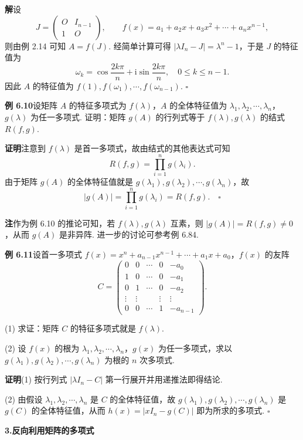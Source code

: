 \documentclass[UTF8, 12pt, fontset=fandol, oneside]{ctexart}
\begin{document}
\noindent\textbf{解}\quad 设
\[
J=\left(\begin{array}{cc}
O & I_{n-1}\\
1 & O
\end{array}\right),\qquad
f(x)=a_1+a_2x+a_3x^2+\cdots+a_nx^{n-1},
\]
则由例 2.14 可知 $A=f(J)$. 经简单计算可得 $|\lambda I_n-J|=\lambda^n-1$，于是 $J$ 的特征值为
\[
\omega_k=\cos\frac{2k\pi}{n}+\mathrm{i}\sin\frac{2k\pi}{n},\quad 0\le k\le n-1.
\]
因此 $A$ 的特征值为 $f(1),f(\omega_1),\cdots,f(\omega_{n-1})$. $\square$

\noindent\textbf{例 6.10}\quad 设矩阵 $A$ 的特征多项式为 $f(\lambda)$，$A$ 的全体特征值为 $\lambda_1,\lambda_2,\cdots,\lambda_n$，$g(\lambda)$ 为任一多项式. 证明：矩阵 $g(A)$ 的行列式等于 $f(\lambda),g(\lambda)$ 的结式 $R(f,g)$.

\noindent\textbf{证明}\quad 注意到 $f(\lambda)$ 是首一多项式，故由结式的其他表达式可知
\[
R(f,g)=\prod_{i=1}^n g(\lambda_i).
\]
由于矩阵 $g(A)$ 的全体特征值就是 $g(\lambda_1),g(\lambda_2),\cdots,g(\lambda_n)$，故
\[
|g(A)|=\prod_{i=1}^n g(\lambda_i)=R(f,g). \quad \square
\]

\noindent\textbf{注}\quad 作为例 6.10 的推论可知，若 $f(\lambda),g(\lambda)$ 互素，则 $|g(A)|=R(f,g)\ne 0$，从而 $g(A)$ 是非异阵. 进一步的讨论可参考例 6.84.

\noindent\textbf{例 6.11}\quad 设首一多项式 $f(x)=x^n+a_{n-1}x^{n-1}+\cdots+a_1x+a_0$，$f(x)$ 的友阵
\[
C=\left(\begin{array}{ccccc}
0 & 0 & \cdots & 0 & -a_0\\
1 & 0 & \cdots & 0 & -a_1\\
0 & 1 & \cdots & 0 & -a_2\\
\vdots & \vdots & & \vdots & \vdots\\
0 & 0 & \cdots & 1 & -a_{n-1}
\end{array}\right).
\]

(1) 求证：矩阵 $C$ 的特征多项式就是 $f(\lambda)$.

(2) 设 $f(x)$ 的根为 $\lambda_1,\lambda_2,\cdots,\lambda_n$，$g(x)$ 为任一多项式，求以 $g(\lambda_1),g(\lambda_2),\cdots,g(\lambda_n)$ 为根的 $n$ 次多项式.

\noindent\textbf{证明}\quad (1) 按行列式 $|\lambda I_n-C|$ 第一行展开并用递推法即得结论.

(2) 由假设 $\lambda_1,\lambda_2,\cdots,\lambda_n$ 是 $C$ 的全体特征值，故 $g(\lambda_1),g(\lambda_2),\cdots,g(\lambda_n)$ 是 $g(C)$ 的全体特征值，从而 $h(x)=|xI_n-g(C)|$ 即为所求的多项式. $\square$

\noindent\textbf{3.\quad 反向利用矩阵的多项式}
\end{document}
